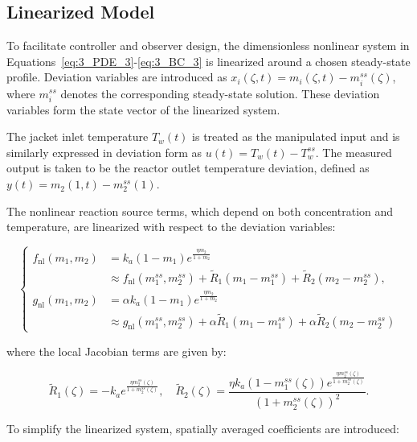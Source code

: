\subsection{Linearized Model}

To facilitate controller and observer design, the dimensionless nonlinear system in Equations~\eqref{eq:3_PDE_3}-\eqref{eq:3_BC_3} is linearized around a chosen steady-state profile. Deviation variables are introduced as $ x_i(\zeta, t) = m_i(\zeta, t) - m_i^{ss}(\zeta) $, where $ m_i^{ss} $ denotes the corresponding steady-state solution. These deviation variables form the state vector of the linearized system. 

The jacket inlet temperature $ T_w(t) $ is treated as the manipulated input and is similarly expressed in deviation form as $ u(t) = T_w(t) - T_w^{ss} $. The measured output is taken to be the reactor outlet temperature deviation, defined as $ y(t) = m_2(1, t) - m_2^{ss}(1) $.

The nonlinear reaction source terms, which depend on both concentration and temperature, are linearized with respect to the deviation variables:

\begin{equation}
\begin{cases}
    f_{\text{nl}}(m_1, m_2) &= k_a (1 - m_1) e^{\frac{\eta m_2}{1 + m_2}} \\
    &\approx f_{\text{nl}}(m_{1}^{ss}, m_{2}^{ss}) + \tilde{R}_1 (m_1 - m_{1}^{ss}) + \tilde{R}_2 (m_2 - m_{2}^{ss}), \\[1.8ex]
    g_{\text{nl}}(m_1, m_2) &= \alpha k_a (1 - m_1) e^{\frac{\eta m_2}{1 + m_2}} \\
    &\approx g_{\text{nl}}(m_{1}^{ss}, m_{2}^{ss}) + \alpha \tilde{R}_1 (m_1 - m_{1}^{ss}) + \alpha \tilde{R}_2 (m_2 - m_{2}^{ss})
\end{cases}
\end{equation}


where the local Jacobian terms are given by:

\begin{equation}
    \tilde{R}_1(\zeta) = -k_a e^{\frac{\eta m_{2}^{ss}(\zeta)}{1 + m_{2}^{ss}(\zeta)}}, \quad
    \tilde{R}_2(\zeta) = \frac{\eta k_a (1 - m_{1}^{ss}(\zeta)) e^{\frac{\eta m_{2}^{ss}(\zeta)}{1 + m_{2}^{ss}(\zeta)}}}{(1 + m_{2}^{ss}(\zeta))^2}.
\end{equation}

To simplify the linearized system, spatially averaged coefficients are introduced:

